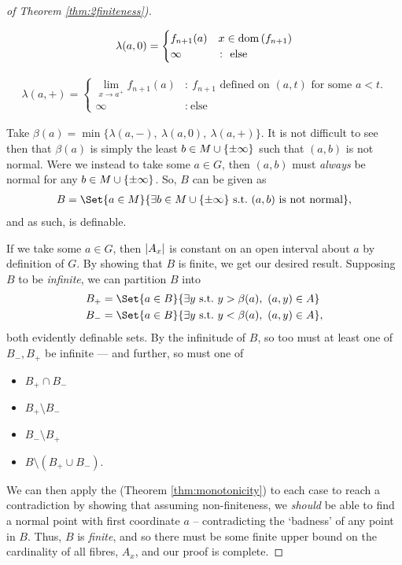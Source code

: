 \begin{proof}[of Theorem \ref{thm:2finiteness})]
\begin{description}
		\item
			\begin{align*}
						\lambda(a, 0) = \begin{cases}
									      f_{n + 1}(a) & x \in \dom{f_{n+1}} \\
									      \infty & \colon \ \textrm{else}
									   \end{cases}
			\end{align*}

		\item
			\begin{align*}
						\lambda(a, +) = \begin{cases}
									      \displaystyle\lim_{x \to a^{+}} f_{n + 1}(a) & \colon \ \textrm{$f_{n+1}$ defined on $(a, t)$ for some $a < t$.} \\
									      \infty & \colon \ \textrm{else}
									   \end{cases}
			\end{align*}
	\end{description}

	Take $\beta(a) = \min{\{ \lambda(a, -),\ \lambda(a, 0),\ \lambda(a, +) \}}$. It is not difficult to see then that $\beta(a)$ is simply the least $b \in M \cup \{ \pm \infty \}$ such that $(a, b)$ is not normal. Were we instead to take some $a \in G$, then $(a, b)$ must \emph{always} be normal for any $b \in M \cup \{ \pm \infty \}$. So, $B$ can be given as
	\begin{align*}
		B = \Set{a \in M}{\exists b \in \Minf \ \textrm{s.t.} \ (a, b) \ \textrm{is not normal}},
	\end{align*}
	and as such, is definable.

	If we take some $a \in G$, then $\vert A_x\vert$ is constant on an open interval about $a$ by definition of $G$. By showing that $B$ is finite, we get our desired result. Supposing $B$ to be \emph{infinite}, we can partition $B$ into
	\begin{align*}
		B_+ &= \Set{a \in B}{\exists y \ \textrm{s.t.} \ y > \beta(a), \ (a, y) \in A} \\
		B_- &= \Set{a \in B}{\exists y \ \textrm{s.t.} \ y < \beta(a), \ (a, y) \in A},
	\end{align*}
	both evidently definable sets. By the infinitude of $B$, so too must at least one of $B_-, B_+$ be infinite — and further, so must one of
	\begin{itemize}
		\item $B_+ \cap B_-$
		\item $B_+ \setminus B_-$
		\item $B_- \setminus B_+$
		\item $B \setminus (B_+ \cup B_-)$.
	\end{itemize}
	We can then apply the \Mt (Theorem \ref{thm:monotonicity}) to each case to reach a contradiction by showing that assuming non-finiteness, we \emph{should} be able to find a normal point with first coordinate $a$ -- contradicting the `badness' of any point in $B$. Thus, $B$ is \emph{finite}, and so there must be some finite upper bound on the cardinality of all fibres, $A_x$, and our proof is complete.
\end{proof}



